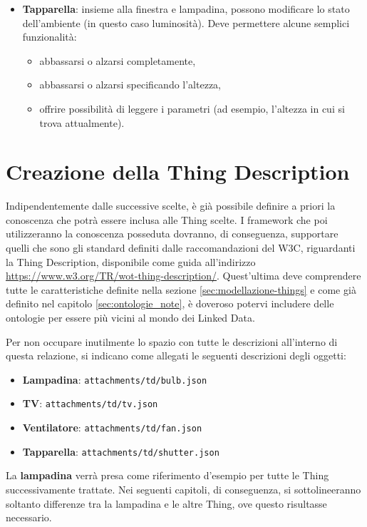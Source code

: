 \documentclass[12pt,a4paper,openright,oneside]{report}
\begin{document}
\begin{itemize}
	\item \textbf{Tapparella}: insieme alla finestra e lampadina, possono modificare lo stato dell'ambiente (in questo caso luminosità). Deve permettere alcune semplici funzionalità:
	\begin{itemize}
		\setlength\itemsep{-0.0em}
		\item abbassarsi o alzarsi completamente,
		\item abbassarsi o alzarsi specificando l'altezza,
		\item offrire possibilità di leggere i parametri (ad esempio, l'altezza in cui si trova attualmente).
	\end{itemize}
\end{itemize}


\section{Creazione della Thing Description}
Indipendentemente dalle successive scelte, è già possibile definire a priori la conoscenza che potrà essere inclusa alle Thing scelte. I framework che poi utilizzeranno la conoscenza posseduta dovranno, di conseguenza, supportare quelli che sono gli standard definiti dalle raccomandazioni del W3C, riguardanti la Thing Description, disponibile come guida all'indirizzo \url{https://www.w3.org/TR/wot-thing-description/}. Quest'ultima deve comprendere tutte le caratteristiche definite nella sezione \ref{sec:modellazione-things} e come già definito nel capitolo \ref{sec:ontologie_note}, è doveroso potervi includere delle ontologie per essere più vicini al mondo dei Linked Data.

Per non occupare inutilmente lo spazio con tutte le descrizioni all'interno di questa relazione, si indicano come allegati le seguenti descrizioni degli oggetti:

\begin{itemize}
	\setlength\itemsep{-0.3em}
	\item \textbf{Lampadina}: \texttt{attachments/td/bulb.json}
	\item \textbf{TV}: \texttt{attachments/td/tv.json}
	\item \textbf{Ventilatore}: \texttt{attachments/td/fan.json}
	\item \textbf{Tapparella}: \texttt{attachments/td/shutter.json}
\end{itemize}

La \textbf{lampadina} verrà presa come riferimento d'esempio per tutte le Thing successivamente trattate. Nei seguenti capitoli, di conseguenza, si sottolineeranno soltanto differenze tra la lampadina e le altre Thing, ove questo risultasse necessario.
\end{document}
